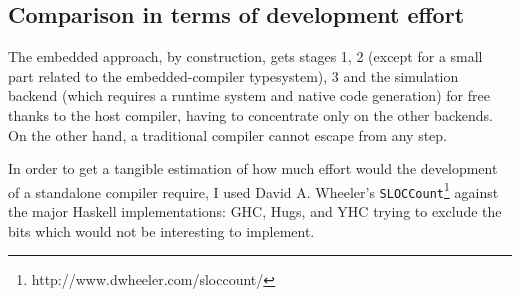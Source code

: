 \documentclass[a4paper,twoside,11pt]{article}
\begin{document}
\subsection{Comparison in terms of development effort}

The embedded approach, by construction, gets stages 1, 2 (except for a small
part related to the embedded-compiler typesystem), 3 and the simulation
backend (which requires a runtime system and native code generation) for free
thanks to the host compiler, having to concentrate only on the other
backends. On the other hand, a traditional compiler cannot escape from any
step. 

In order to get a tangible estimation of how much effort would the development
of a standalone compiler require, I used David A. Wheeler's
\texttt{SLOCCount}\footnote{http://www.dwheeler.com/sloccount/} against the
major Haskell implementations: GHC, Hugs, and YHC trying to exclude the bits
which would not be interesting to implement.
\end{document}
